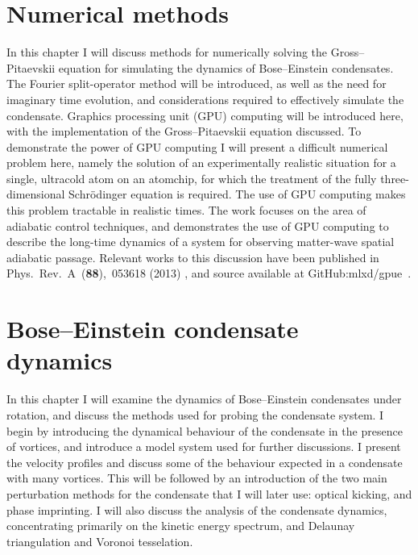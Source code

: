 \section{Numerical methods}
In this chapter I will discuss methods for numerically solving the Gross--Pitaevskii equation for simulating the dynamics of Bose--Einstein condensates. The Fourier split-operator method will be introduced, as well as the need for imaginary time evolution, and considerations required to effectively simulate the condensate. Graphics processing unit (GPU) computing will be introduced here, with the implementation of the Gross--Pitaevskii equation discussed. To demonstrate the power of GPU computing I will present a difficult numerical problem here, namely the solution of an experimentally realistic situation for a single, ultracold atom on an atomchip, for which the treatment of the fully three-dimensional Schr\"odinger equation is required. The use of GPU computing makes this problem tractable in realistic times. The work focuses on the area of adiabatic control techniques, and demonstrates the use of GPU computing to describe the long-time dynamics of a system for observing matter-wave spatial adiabatic passage. Relevant works to this discussion have been published in Phys.~Rev.~A~(\textbf{88}),~053618 (2013) \cite{AO:Morgan_pra_2013}, and source available at GitHub:mlxd/gpue~\cite{MLXD_GPUE}.

\section{Bose--Einstein condensate dynamics}
In this chapter I will examine the dynamics of Bose--Einstein condensates under rotation, and discuss the methods used for probing the condensate system. I begin by introducing the dynamical behaviour of the condensate in the presence of vortices, and introduce a model system used for further discussions. I present the velocity profiles and discuss some of the behaviour expected in a condensate with many vortices. This will be followed by an introduction of the two main perturbation methods for the condensate that I will later use: optical kicking, and phase imprinting. I will also discuss the analysis of the condensate dynamics, concentrating primarily on the kinetic energy spectrum, and Delaunay triangulation and Voronoi tesselation.

